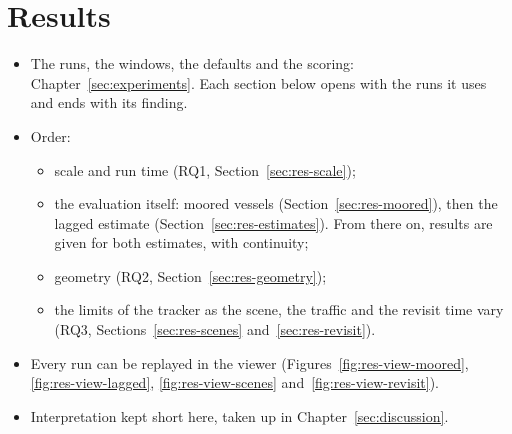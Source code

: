 \section{Results}
\label{sec:results}


\begin{itemize}
    \item The runs, the windows, the defaults and the scoring: Chapter~\ref{sec:experiments}. Each section below opens with the runs it uses and ends with its finding.
    \item Order:
    \begin{itemize}
        \item scale and run time (RQ1, Section~\ref{sec:res-scale});
        \item the evaluation itself: moored vessels (Section~\ref{sec:res-moored}), then the lagged estimate (Section~\ref{sec:res-estimates}). From there on, results are given for both estimates, with continuity;
        \item geometry (RQ2, Section~\ref{sec:res-geometry});
        \item the limits of the tracker as the scene, the traffic and the revisit time vary (RQ3, Sections~\ref{sec:res-scenes} and~\ref{sec:res-revisit}).
    \end{itemize}
    \item Every run can be replayed in the viewer (Figures~\ref{fig:res-view-moored}, \ref{fig:res-view-lagged}, \ref{fig:res-view-scenes} and~\ref{fig:res-view-revisit}).
    \item Interpretation kept short here, taken up in Chapter~\ref{sec:discussion}.
\end{itemize}

